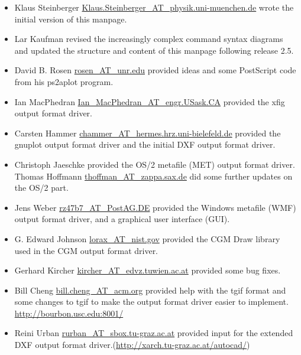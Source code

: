 \documentclass[english,a4paper]{article}
\let\URL\url \let\Email\url \let\File\url
\begin{document}
\begin{itemize}\setlength{\itemsep}{0cm}

  \item Klaus Steinberger \Email{Klaus.Steinberger_AT_physik.uni-muenchen.de}
     wrote the initial version of this manpage.

  \item Lar Kaufman revised the increasingly complex
     command syntax diagrams and updated the structure and content of this
     manpage following release 2.5. 

  \item David B. Rosen \Email{rosen_AT_unr.edu} provided ideas and some PostScript
     code from his ps2aplot program.

  \item Ian MacPhedran \Email{Ian_MacPhedran_AT_engr.USask.CA} provided the xfig
     output format driver.

  \item Carsten Hammer \Email{chammer_AT_hermes.hrz.uni-bielefeld.de} provided the
     gnuplot output format driver and the initial DXF output format driver.

  \item Christoph Jaeschke provided the OS/2 metafile (MET) output format driver. 
  Thomas Hoffmann \Email{thoffman_AT_zappa.sax.de} did some further updates on the OS/2 part.

  \item Jens Weber \Email{rz47b7_AT_PostAG.DE} provided the Windows metafile (WMF)
     output format driver, and a graphical user interface (GUI).

  \item G. Edward Johnson \Email{lorax_AT_nist.gov} provided the CGM Draw library
     used in the CGM output format driver.

  \item Gerhard Kircher \Email{kircher_AT_edvz.tuwien.ac.at} provided some bug
     fixes.

  \item Bill Cheng \Email{bill.cheng_AT_acm.org} provided help with the tgif
     format and some changes to tgif to make the output format driver easier to implement.
     \URL{http://bourbon.usc.edu:8001/}

  \item Reini Urban \Email{rurban_AT_sbox.tu-graz.ac.at} provided input for the
     extended DXF output format driver.(\URL{http://xarch.tu-graz.ac.at/autocad/})


\end{itemize}
\end{document}
